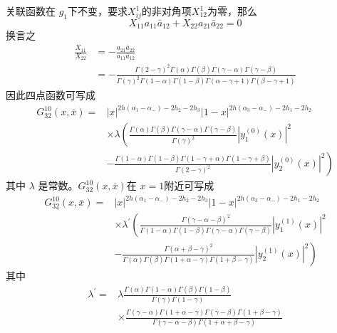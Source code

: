 关联函数在 $g_1 $下不变，要求$ X_{i j}^{1} $的非对角项$ X_{12}^{1} $为零，那么
$$
X_{11} a_{11} \bar{a}_{12}+X_{22} a_{21} \bar{a}_{22}=0
$$
换言之
\begin{equation}
	\begin{aligned} \frac{X_{11}}{X_{22}} &=-\frac{a_{21} \bar{a}_{22}}{a_{11} \bar{a}_{12}} \\ &=-\frac{\Gamma(2-\gamma)^{2} \Gamma(\alpha) \Gamma(\beta) \Gamma(\gamma-\alpha) \Gamma(\gamma-\beta)}{\Gamma(\gamma)^{2} \Gamma(1-\alpha) \Gamma(1-\beta) \Gamma(\alpha-\gamma+1) \Gamma(\beta-\gamma+1)} \end{aligned}
\end{equation} 
因此四点函数可写成
\begin{equation}
	\begin{aligned} G_{32}^{10}(x, \bar{x})=&|x|^{2 h\left(\alpha_{1}-\alpha_{-}\right)-2 h_{2}-2 h_{3}}|1-x|^{2 h\left(\alpha_{3}-\alpha_{-}\right)-2 h_{1}-2 h_{2}} \\ & \times \lambda\left(\frac{\Gamma(\alpha) \Gamma(\beta) \Gamma(\gamma-\alpha) \Gamma(\gamma-\beta)}{\Gamma(\gamma)^{2}}\left|y_{1}^{(0)}(x)\right|^{2}\right.\\&\left.-\frac{\Gamma(1-\alpha) \Gamma(1-\beta) \Gamma(1-\gamma+\alpha) \Gamma(1-\gamma+\beta)}{\Gamma(2-\gamma)^{2}}\left|y_{2}^{(0)}(x)\right|^{2}\right) \end{aligned}
\end{equation} 
其中 $\lambda$ 是常数。$ G_{32}^{10}(x, \bar{x}) $在 $x=1 $附近可写成
\begin{equation}
	\begin{aligned} G_{32}^{10}(x, \bar{x})=&|x|^{2 h\left(\alpha_{1}-\alpha_{-}\right)-2 h_{2}-2 h_{3}}|1-x|^{2 h\left(\alpha_{3}-\alpha_{-}\right)-2 h_{1}-2 h_{2}} \\ & \times \lambda^{\prime}\left(\frac{\Gamma(\gamma-\alpha-\beta)^{2}}{\Gamma(1-\alpha) \Gamma(1-\beta) \Gamma(\gamma-\alpha) \Gamma(\gamma-\beta)}\left|y_{1}^{(1)}(x)\right|^{2}\right.\\&\left.-\frac{\Gamma(\alpha+\beta-\gamma)^{2}}{\Gamma(\alpha) \Gamma(\beta) \Gamma(1+\alpha-\gamma) \Gamma(1+\beta-\gamma)}\left|y_{2}^{(1)}(x)\right|^{2}\right) \end{aligned}
\end{equation} 
其中
\begin{equation}
	\begin{aligned} \lambda^{\prime}=& \lambda \frac{\Gamma(\alpha) \Gamma(1-\alpha) \Gamma(\beta) \Gamma(1-\beta)}{\Gamma(\gamma) \Gamma(1-\gamma)} \\ & \times \frac{\Gamma(\gamma-\alpha) \Gamma(1+\alpha-\gamma) \Gamma(\gamma-\beta) \Gamma(1+\beta-\gamma)}{\Gamma(\gamma-\alpha-\beta) \Gamma(1+\alpha+\beta-\gamma)} \end{aligned} 
\end{equation}

